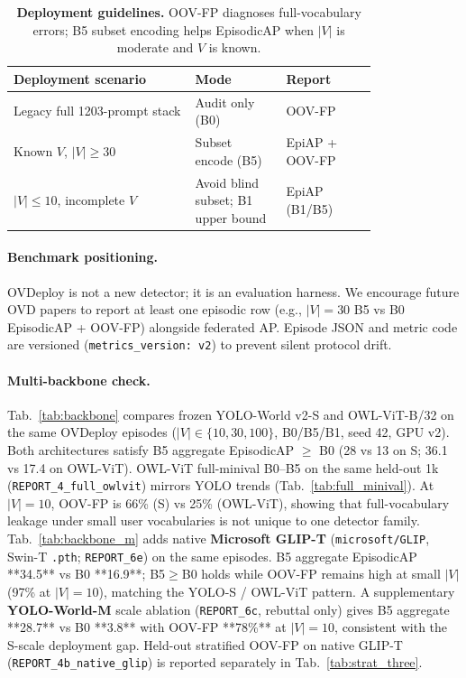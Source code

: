 \documentclass[10pt,twocolumn,letterpaper]{article}
\begin{document}
\begin{table}[t]
\centering
\small
\setlength{\tabcolsep}{3pt}
\begin{tabular}{@{}p{0.40\linewidth}p{0.20\linewidth}p{0.20\linewidth}@{}}
\toprule
Deployment scenario & Mode & Report \\
\midrule
Legacy full 1203-prompt stack & Audit only (B0) & OOV-FP \\
Known $V$, $|V|{\ge}30$ & Subset encode (B5) & EpiAP + OOV-FP \\
$|V|{\le}10$, incomplete $V$ & Avoid blind subset; B1 upper bound & EpiAP (B1/B5) \\
\bottomrule
\end{tabular}
\caption{\textbf{Deployment guidelines.} OOV-FP diagnoses full-vocabulary errors; B5 subset encoding helps EpisodicAP when $|V|$ is moderate and $V$ is known.}
\label{tab:deploy}
\end{table}

\paragraph{Benchmark positioning.}
OVDeploy is not a new detector; it is an evaluation harness.
We encourage future OVD papers to report at least one episodic row (e.g., $|V|{=}30$ B5 vs B0 EpisodicAP + OOV-FP) alongside federated AP.
Episode JSON and metric code are versioned (\texttt{metrics\_version: v2}) to prevent silent protocol drift.

\paragraph{Multi-backbone check.}
Tab.~\ref{tab:backbone} compares frozen YOLO-World v2-S and OWL-ViT-B/32 on the same OVDeploy episodes ($|V|{\in}\{10,30,100\}$, B0/B5/B1, seed 42, GPU v2).
Both architectures satisfy B5 aggregate EpisodicAP $\ge$ B0 (28 vs 13 on S; 36.1 vs 17.4 on OWL-ViT).
OWL-ViT full-minival B0--B5 on the same held-out 1k (\texttt{REPORT\_4\_full\_owlvit}) mirrors YOLO trends (Tab.~\ref{tab:full_minival}).
At $|V|{=}10$, OOV-FP is 66\% (S) vs 25\% (OWL-ViT), showing that full-vocabulary leakage under small user vocabularies is not unique to one detector family.
Tab.~\ref{tab:backbone_m} adds native \textbf{Microsoft GLIP-T} (\texttt{microsoft/GLIP}, Swin-T \texttt{.pth}; \texttt{REPORT\_6e}) on the same episodes.
B5 aggregate EpisodicAP **34.5** vs B0 **16.9**; B5$\ge$B0 holds while OOV-FP remains high at small $|V|$ (97\% at $|V|{=}10$), matching the YOLO-S / OWL-ViT pattern.
A supplementary \textbf{YOLO-World-M} scale ablation (\texttt{REPORT\_6c}, rebuttal only) gives B5 aggregate **28.7** vs B0 **3.8** with OOV-FP **78\%** at $|V|{=}10$, consistent with the S-scale deployment gap.
Held-out stratified OOV-FP on native GLIP-T (\texttt{REPORT\_4b\_native\_glip}) is reported separately in Tab.~\ref{tab:strat_three}.
\end{document}
